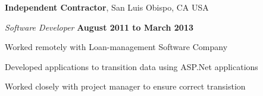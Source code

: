 \documentclass[10pt]{article}
\begin{document}
{\textbf{Independent Contractor}}, San Luis Obispo, CA USA
\begin{outerlist}
\item[] \textit{Software Developer}%
    \hfill \textbf{August 2011 to March 2013}
    \begin{innerlist}%
    \item Worked remotely with Loan-management Software Company
    \item Developed applications to transition data using ASP.Net applications
    \item Worked closely with project manager to ensure correct transistion
\end{innerlist}

\end{outerlist}

\halfblankline
\end{document}
